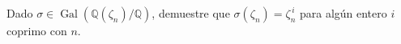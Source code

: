 Dado $\sigma\in\operatorname{Gal}(\mathbb{Q}(\zeta_{n})/\mathbb{Q})$, demuestre que $\sigma(\zeta_{n})=\zeta_{n}^{\,i}$ para algún entero $i$ coprimo con $n$.
